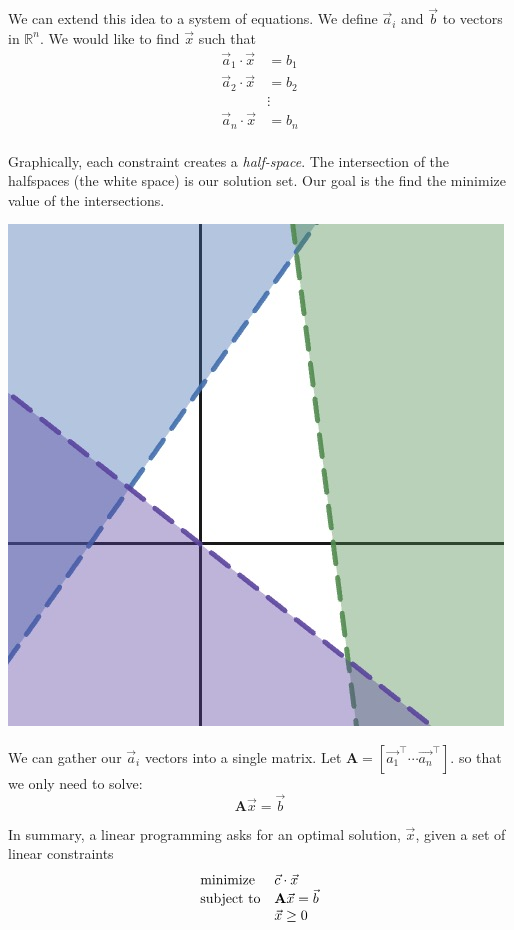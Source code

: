 \documentclass{article}
\begin{document}
We can extend this idea to a system of equations. We define \( \vec{a}_i \) and \( \vec{b} \) to vectors in $\mathbb{R}^n$. We would like to find \( \vec{x} \) such that
\begin{align*}
\vec{a}_1 \cdot \vec{x} &= b_1 \\
\vec{a}_2 \cdot \vec{x} &= b_2 \\
& \vdots  \\
\vec{a}_n \cdot \vec{x} &= b_n \\
\end{align*}

Graphically, each constraint creates a \emph{half-space}. 
The intersection of the halfspaces (the white space) is our solution set. 
Our goal is the find the minimize value of the intersections.
\begin{center}
  \includegraphics[scale=.2]{assets/half_space.jpg}  
\end{center}

We can gather our \( \vec{a}_i \) vectors into a single matrix. 
Let $\mathbf{A} = [\vec{a_1}^\top \cdots \vec{a_n}^\top]$.
so that we only need to solve:
\[
\mathbf{A} \vec{x} = \vec{b}
\]

In summary, a linear programming asks for an optimal solution, \( \vec{x} \), given a set of linear constraints
\begin{align*}
  \begin{array}{ll@{}ll}
    \text{minimize} & \vec{c} \cdot \vec{x}&\\
    \text{subject to}& \mathbf{A} \vec{x} = \vec{b} \\
    & \vec{x} \geq 0 \\
    \end{array}
\end{align*}
\end{document}
